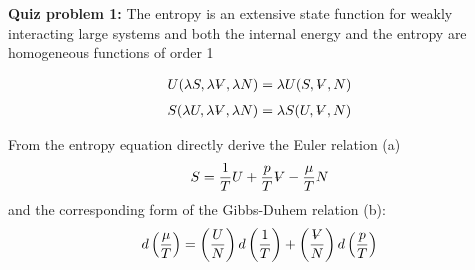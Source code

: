 \documentclass[10pt]{article}
\newcommand{\vol}{{\ooalign{\hfil$V$\hfil\cr\kern0.08em--\hfil\cr}}}
\begin{document}
\noindent\textbf{Quiz problem 1:} The entropy is an extensive state function for weakly interacting large systems and both the internal energy and the entropy are homogeneous functions of order 1

\begin{align}\label{Uftn}
U(\lambda S, \lambda \vol, \lambda N)=\lambda U(S, \vol, N)
\end{align}
\begin{align}\label{Sftn}
S(\lambda U, \lambda \vol, \lambda N)=\lambda S(U, \vol, N)
\end{align}

From the entropy equation directly derive the Euler relation (a)
\begin{equation}
S=\frac{1}{T} U+\frac{p}{T} \vol-\frac{\mu}{T} N
\end{equation}
and the corresponding form of the Gibbs-Duhem relation (b):
\begin{equation}
d\left(\frac{\mu}{T}\right)=\left(\frac{U}{N}\right) d\left(\frac{1}{T}\right)+\left(\frac{\vol}{N}\right) d\left(\frac{p}{T}\right)
\end{equation}
\end{document}
